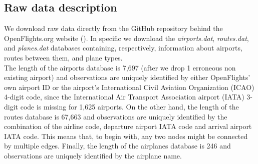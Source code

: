 \documentclass{Resources/netsci-project}
\begin{document}
\subsection{Raw data description}
We download raw data directly from the GitHub repository behind the OpenFlights.org website (\cite{OpenFlights2008}). In specific we download the \textit{airports.dat}, \textit{routes.dat}, and \textit{planes.dat} databases containing, respectively, information about airports, routes between them, and plane types. \\
The length of the airports database is 7,697 (after we drop 1 erroneous non existing airport) and observations are uniquely identified by either OpenFlights' own airport ID or the airport's International Civil Aviation Organization (ICAO) 4-digit code, since the International Air Transport Association airport (IATA) 3-digit code is missing for 1,625 airports. On the other hand, the length of the routes database is 67,663 and observations are uniquely identified by the combination of the airline code, departure airport IATA code and arrival airport IATA code. This means that, to begin with, any two nodes might be connected by multiple edges. Finally, the length of the airplanes database is 246 and observations are uniquely identified by the airplane name.

\end{document}
